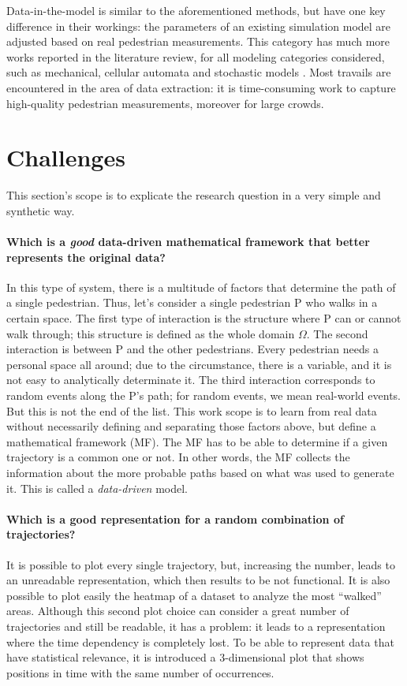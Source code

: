 \documentclass[class=article, crop=false]{standalone}
\begin{document}
Data-in-the-model is similar to the aforementioned methods, but have one key difference in their workings: the parameters of an existing simulation model are adjusted based on real pedestrian measurements. This category has much more works reported in the literature review, for all modeling categories considered, such as mechanical, cellular automata and stochastic models \cite{crowd_simulation,interactive_crowd_simulation,data_driven_simulation}. Most travails are encountered in the area of data extraction: it is time-consuming work to capture high-quality pedestrian measurements, moreover for large crowds.


\section{Challenges}
This section's scope is to explicate the research question in a very simple and synthetic way.

\paragraph{Which is a \emph{good} data-driven mathematical framework that better represents the original data?}
In this type of system, there is a multitude of factors that determine the path of a single pedestrian. 
Thus, let’s consider a single pedestrian P who walks in a certain space. 
The first type of interaction is the structure where P can or cannot walk through; this structure is defined as the whole domain $\Omega$. 
The second interaction is between P and the other pedestrians. 
Every pedestrian needs a personal space all around; due to the circumstance, there is a variable, and it is not easy to analytically determinate it.
The third interaction corresponds to random events along the P’s path; for random events, we mean real-world events.
But this is not the end of the list.
This work scope is to learn from real data without necessarily defining and separating those factors above, but define a mathematical framework (MF).
The MF has to be able to determine if a given trajectory is a common one or not. 
In other words, the MF collects the information about the more probable paths based on what was used to generate it.
This is called a \emph{data-driven} model.


\paragraph{Which is a good representation for a random combination of trajectories?}
It is possible to plot every single trajectory, but, increasing the number, leads to an unreadable representation, which then results to be not functional. 
It is also possible to plot easily the heatmap of a dataset to analyze the most “walked” areas. 
Although this second plot choice can consider a great number of trajectories and still be readable, it has a problem: it leads to a representation where the time dependency is completely lost.
To be able to represent data that have statistical relevance, it is introduced a 3-dimensional plot that shows positions in time with the same number of occurrences.
\end{document}

